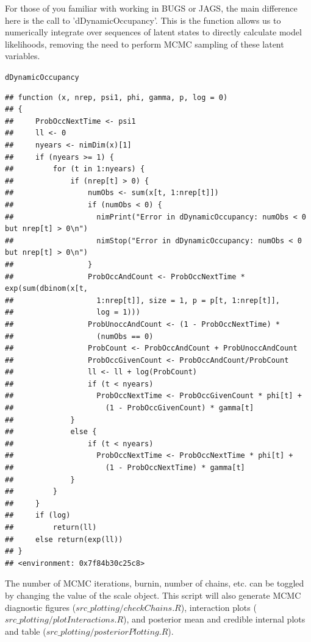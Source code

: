 \documentclass{article}\usepackage[]{graphicx}\usepackage[]{color}
\makeatletter
\newcommand{\hlstd}[1]{\textcolor[rgb]{0.345,0.345,0.345}{#1}}%
\newenvironment{kframe}{%
 \def\at@end@of@kframe{}%
 \ifinner\ifhmode%
  \def\at@end@of@kframe{\end{minipage}}%
  \begin{minipage}{\columnwidth}%
 \fi\fi%
 \def\FrameCommand##1{\hskip\@totalleftmargin \hskip-\fboxsep
 \colorbox{shadecolor}{##1}\hskip-\fboxsep
     \hskip-\linewidth \hskip-\@totalleftmargin \hskip\columnwidth}%
 \MakeFramed {\advance\hsize-\width
   \@totalleftmargin\z@ \linewidth\hsize
   \@setminipage}}%
 {\par\unskip\endMakeFramed%
 \at@end@of@kframe}
\newenvironment{knitrout}{}{} %
\makeatother
\begin{document}
For those of you familiar with working in BUGS or JAGS, the main
difference here is the call to 'dDynamicOccupancy'. This is the
function allows us to numerically integrate over sequences of latent
states to directly calculate model likelihoods, removing the need to
perform MCMC sampling of these latent variables.



\begin{knitrout}
\color{fgcolor}\begin{kframe}
\begin{alltt}
\hlstd{dDynamicOccupancy}
\end{alltt}
\begin{verbatim}
## function (x, nrep, psi1, phi, gamma, p, log = 0) 
## {
##     ProbOccNextTime <- psi1
##     ll <- 0
##     nyears <- nimDim(x)[1]
##     if (nyears >= 1) {
##         for (t in 1:nyears) {
##             if (nrep[t] > 0) {
##                 numObs <- sum(x[t, 1:nrep[t]])
##                 if (numObs < 0) {
##                   nimPrint("Error in dDynamicOccupancy: numObs < 0 but nrep[t] > 0\n")
##                   nimStop("Error in dDynamicOccupancy: numObs < 0 but nrep[t] > 0\n")
##                 }
##                 ProbOccAndCount <- ProbOccNextTime * exp(sum(dbinom(x[t, 
##                   1:nrep[t]], size = 1, p = p[t, 1:nrep[t]], 
##                   log = 1)))
##                 ProbUnoccAndCount <- (1 - ProbOccNextTime) * 
##                   (numObs == 0)
##                 ProbCount <- ProbOccAndCount + ProbUnoccAndCount
##                 ProbOccGivenCount <- ProbOccAndCount/ProbCount
##                 ll <- ll + log(ProbCount)
##                 if (t < nyears) 
##                   ProbOccNextTime <- ProbOccGivenCount * phi[t] + 
##                     (1 - ProbOccGivenCount) * gamma[t]
##             }
##             else {
##                 if (t < nyears) 
##                   ProbOccNextTime <- ProbOccNextTime * phi[t] + 
##                     (1 - ProbOccNextTime) * gamma[t]
##             }
##         }
##     }
##     if (log) 
##         return(ll)
##     else return(exp(ll))
## }
## <environment: 0x7f84b30c25c8>
\end{verbatim}
\end{kframe}
\end{knitrout}

The number of MCMC iterations, burnin, number of chains, etc. can be
toggled by changing the value of the scale object. This script will
also generate MCMC diagnostic figures ($src\_plotting/checkChains.R$),
interaction plots ($src\_plotting/plotInteractions.R$), and posterior
mean and credible internal plots and table ($src\_plotting/posteriorPlotting.R$).
\end{document}
